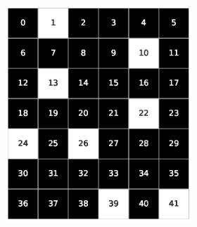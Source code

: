 \begin{figure}[h!]
\begin{subfigure}[b]{\textwidth}
\begin{subfigure}[b]{0.20\textwidth}
        \end{subfigure}
        \hspace{3em}
        \begin{subfigure}[b]{0.20\textwidth}
            \includegraphics[width=\columnwidth]{images/Tai42c_7x6_80.eps}
        \end{subfigure}
     \end{subfigure}
     \caption{Soluzioni delle istanze Tai42c a densità 30\%, 60\% e 80\%}
     \vspace*{1cm}
     \begin{subfigure}[b]{\textwidth}
        \centering
        \begin{subfigure}[b]{0.20\textwidth}

\end{subfigure}
\end{subfigure}
\end{figure}
